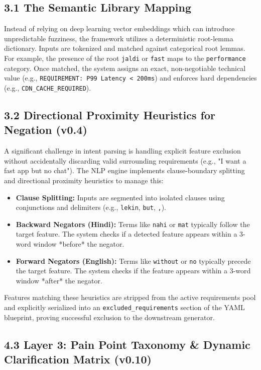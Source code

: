\documentclass[11pt,a4paper]{article}
\begin{document}
\subsection{3.1 The Semantic Library Mapping}
Instead of relying on deep learning vector embeddings which can introduce unpredictable fuzziness, the framework utilizes a deterministic root-lemma dictionary. Inputs are tokenized and matched against categorical root lemmas. For example, the presence of the root \texttt{jaldi} or \texttt{fast} maps to the \texttt{performance} category. Once matched, the system assigns an exact, non-negotiable technical value (e.g., \texttt{REQUIREMENT: P99 Latency < 200ms}) and enforces hard dependencies (e.g., \texttt{CDN_CACHE_REQUIRED}). 

\subsection{3.2 Directional Proximity Heuristics for Negation (v0.4)}
A significant challenge in intent parsing is handling explicit feature exclusion without accidentally discarding valid surrounding requirements (e.g., "I want a fast app but no chat"). The NLP engine implements clause-boundary splitting and directional proximity heuristics to manage this:
\begin{itemize}
    \item \textbf{Clause Splitting:} Inputs are segmented into isolated clauses using conjunctions and delimiters (e.g., \texttt{lekin}, \texttt{but}, \texttt{,}).
    \item \textbf{Backward Negators (Hindi):} Terms like \texttt{nahi} or \texttt{mat} typically follow the target feature. The system checks if a detected feature appears within a 3-word window *before* the negator.
    \item \textbf{Forward Negators (English):} Terms like \texttt{without} or \texttt{no} typically precede the target feature. The system checks if the feature appears within a 3-word window *after* the negator.
\end{itemize}

Features matching these heuristics are stripped from the active requirements pool and explicitly serialized into an \texttt{excluded_requirements} section of the YAML blueprint, proving successful exclusion to the downstream generator.

\subsection{4.3 Layer 3: Pain Point Taxonomy & Dynamic Clarification Matrix (v0.10)}
\end{document}
